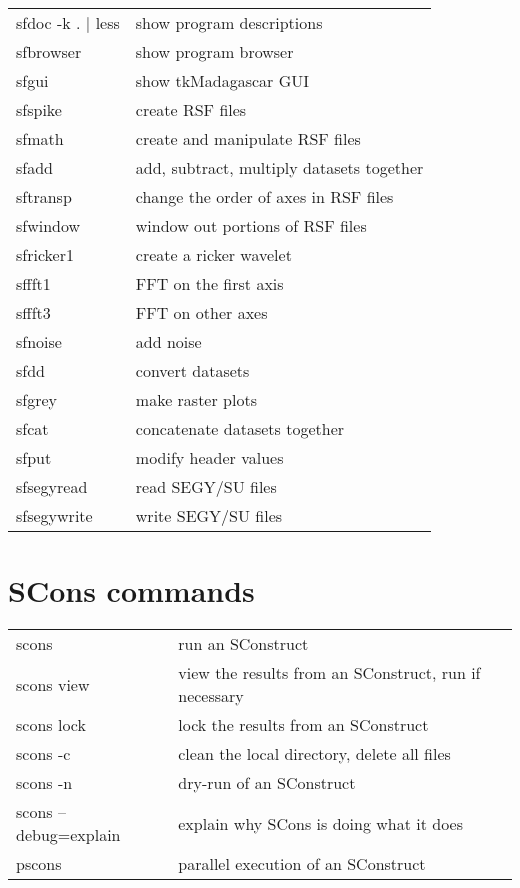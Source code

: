 \begin{tabular}{| l | l |}
   \hline 
   sfdoc -k . $|$ less & show program descriptions \\
   sfbrowser & show program browser \\
   sfgui & show tkMadagascar GUI \\
   sfspike & create RSF files \\
   sfmath & create and manipulate RSF files \\
   sfadd & add, subtract, multiply datasets together \\
   sftransp & change the order of axes in RSF files \\
   sfwindow & window out portions of RSF files \\
   sfricker1 & create a ricker wavelet \\
   sffft1 & FFT on the first axis \\
   sffft3 & FFT on other axes \\
   sfnoise & add noise  \\
   sfdd & convert datasets \\
   sfgrey & make raster plots \\
   sfcat & concatenate datasets together \\
   sfput & modify header values \\
   sfsegyread & read SEGY/SU files \\
   sfsegywrite & write SEGY/SU files \\
   \hline
\end{tabular}

\section{SCons commands}

\begin{tabular}{| l | l |}
    \hline
    scons & run an SConstruct \\
    scons view & view the results from an SConstruct, run if necessary \\
    scons lock & lock the results from an SConstruct \\
    scons -c & clean the local directory, delete all files \\
    scons -n & dry-run of an SConstruct \\
    scons --debug=explain & explain why SCons is doing what it does \\
    pscons & parallel execution of an SConstruct 
    \hline
\end{tabular}
